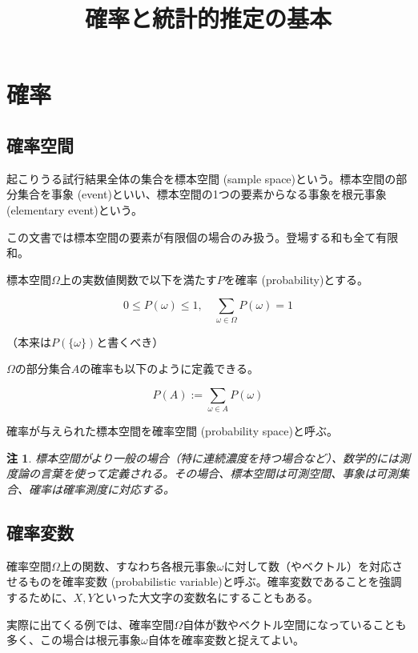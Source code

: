 \documentclass[uplatex,dvipdfmx]{jlreq}
\newcommand\term[1]{\textsf{#1}}
\newtheorem{note}{注}
\begin{document}
\title{確率と統計的推定の基本}
\maketitle

\section{確率}

\subsection{確率空間}

起こりうる試行結果全体の集合を\term{標本空間 (sample space)}という。標本空間の部分集合を\term{事象 (event)}といい、標本空間の1つの要素からなる事象を\term{根元事象 (elementary event)}という。

この文書では標本空間の要素が有限個の場合のみ扱う。登場する和も全て有限和。

標本空間$\Omega$上の実数値関数で以下を満たす$P$を\term{確率 (probability)}とする。

\[
    0 \leq P(\omega) \leq 1,
    \quad \sum_{\omega\in\Omega} P(\omega) = 1
\]

（本来は$P(\{\omega\})$と書くべき）

$\Omega$の部分集合$A$の確率も以下のように定義できる。

\[
    P(A) := \sum_{\omega\in A}P(\omega)
\]

確率が与えられた標本空間を\term{確率空間 (probability space)}と呼ぶ。

\begin{note}
    標本空間がより一般の場合（特に連続濃度を持つ場合など）、数学的には測度論の言葉を使って定義される。その場合、標本空間は可測空間、事象は可測集合、確率は確率測度に対応する。
\end{note}

\subsection{確率変数}

確率空間$\Omega$上の関数、すなわち各根元事象$\omega$に対して数（やベクトル）を対応させるものを\term{確率変数 (probabilistic variable)}と呼ぶ。確率変数であることを強調するために、$X, Y$といった大文字の変数名にすることもある。

実際に出てくる例では、確率空間$\Omega$自体が数やベクトル空間になっていることも多く、この場合は根元事象$\omega$自体を確率変数と捉えてよい。
\end{document}
